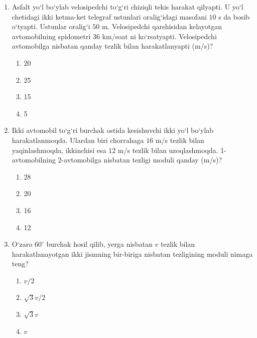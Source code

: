 \begin{enumerate}
\begin{enumerate}[label=\Alph*)]
\item 30
\item 40
\item 50
\item 70

\end{enumerate}


\item Asfalt yo‘l bo‘ylab velosipedchi to‘g‘ri chiziqli tekis harakat qilyapti. U yo‘l chetidagi ikki ketma-ket telegraf ustunlari oralig‘idagi masofani $10$ s da bosib o‘tyapti. Ustunlar oralig‘i $50$ m. Velosipedchi qarshisidan kelayotgan avtomobilning spidometri $36$ km/soat ni ko‘rsatyapti. Velosipedchi avtomobilga nisbatan qanday tezlik bilan harakatlanyapti (m/s)?

\begin{enumerate}[label=\Alph*)]
\item 20
\item 25
\item 15
\item 5

\end{enumerate}


\item Ikki avtomobil to‘g‘ri burchak ostida kesishuvchi ikki yo‘l bo‘ylab
harakatlanmoqda. Ulardan biri chorrahaga $16$ m/s tezlik bilan yaqinlashmoqda, ikkinchisi esa $12$ m/s tezlik bilan uzoqlashmoqda. 1-avtomobilning 2-avtomobilga nisbatan tezligi moduli qanday (m/s)?

\begin{enumerate}[label=\Alph*)]
\item 28
\item 20
\item 16
\item 12

\end{enumerate}


\item O‘zaro $60^\circ$ burchak hosil qilib,
yerga nisbatan $v$ tezlik bilan harakatlanayotgan ikki jismning bir-biriga nisbatan tezligining moduli nimaga teng?

\begin{enumerate}[label=\Alph*)]
\item $v/2$
\item $\sqrt{3}v/2$
\item $\sqrt{3}v$
\item $v$


\end{enumerate}
\end{enumerate}
